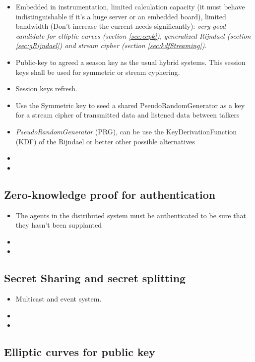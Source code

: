 \documentclass[10pt,a4paper,twoside]{llncs}
\begin{document}
\begin{itemize}
 \item Embedded in instrumentation, limited calculation capacity (it must behave indistinguishable if it's a huge server or an embedded board), limited bandwidth (Don't increase the current needs significantly): \emph{very good candidate for elliptic curves (section \ref{sec:ecpk}), generalized Rijndael (section \ref{sec:gRijndael}) and stream cipher (section \ref{sec:kdfStreaming})}.
 \item Public-key to agreed a season key as the usual hybrid systems. This session keys shall be used for symmetric or stream cyphering.
 \item Session keys refresh.
 \item Use the Symmetric key to seed a shared PseudoRandomGenerator as a key for a stream cipher of transmitted data and listened data between talkers
 \item \emph{PseudoRandomGenerator} (PRG), can be use the KeyDerivationFunction (KDF) of the Rijndael or better other possible alternatives
 \item 
 \item 
\end{itemize}

%
\subsection{Zero-knowledge proof for authentication \label{sec:auth}}
\begin{itemize}
 \item The agents in the distributed system must be authenticated to be sure that they hasn't been supplanted
 \item 
 \item 
\end{itemize}

%
\subsection{Secret Sharing and secret splitting \label{sec:secretSharing}}
\begin{itemize}
 \item Multicast and event system.
 \item 
 \item 
\end{itemize}

%
\subsection{Elliptic curves for public key \label{sec:ecpk}}
\end{document}
